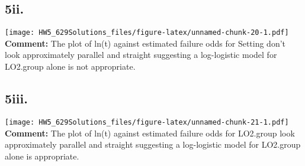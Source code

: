 \documentclass[
]{article}
\newenvironment{Shaded}{\begin{snugshade}}{\end{snugshade}}
\newcommand{\AttributeTok}[1]{\textcolor[rgb]{0.77,0.63,0.00}{#1}}
\newcommand{\DecValTok}[1]{\textcolor[rgb]{0.00,0.00,0.81}{#1}}
\newcommand{\FunctionTok}[1]{\textcolor[rgb]{0.00,0.00,0.00}{#1}}
\newcommand{\NormalTok}[1]{#1}
\newcommand{\SpecialCharTok}[1]{\textcolor[rgb]{0.00,0.00,0.00}{#1}}
\newcommand{\StringTok}[1]{\textcolor[rgb]{0.31,0.60,0.02}{#1}}
\begin{document}
\hypertarget{ii.-3}{%
\subsection{5ii.}\label{ii.-3}}

\begin{Shaded}
\end{Shaded}

\texttt{[image: HW5\_629Solutions\_files/figure-latex/unnamed-chunk-20-1.pdf]}
\textbf{Comment:} The plot of ln(t) against estimated failure odds for
Setting don't look approximately parallel and straight suggesting a
log-logistic model for LO2.group alone is not appropriate.

\hypertarget{iii.-2}{%
\subsection{5iii.}\label{iii.-2}}

\begin{Shaded}
\end{Shaded}

\texttt{[image: HW5\_629Solutions\_files/figure-latex/unnamed-chunk-21-1.pdf]}
\textbf{Comment:} The plot of ln(t) against estimated failure odds for
LO2.group look approximately parallel and straight suggesting a
log-logistic model for LO2.group alone is appropriate.
\end{document}
